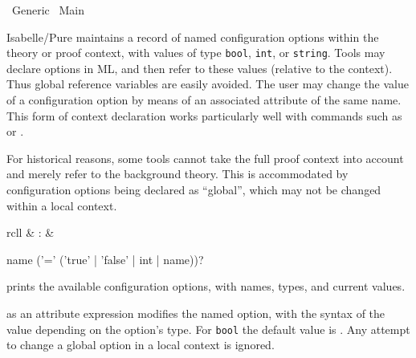 %
\begin{isabellebody}%
\def\isabellecontext{Generic}%
%
\isadelimtheory
\isanewline
\isanewline
%
\endisadelimtheory
%
\isatagtheory
{}\isamarkupfalse%
\ Generic\isanewline
{}\ Main\isanewline
{}%
\endisatagtheory
{\isafoldtheory}%
%
\isadelimtheory
%
\endisadelimtheory
%
\isamarkuptrue%
%
\isamarkuptrue%
%
\begin{isamarkuptext}%
Isabelle/Pure maintains a record of named configuration options
  within the theory or proof context, with values of type \verb|bool|, \verb|int|, or \verb|string|.  Tools may declare
  options in ML, and then refer to these values (relative to the
  context).  Thus global reference variables are easily avoided.  The
  user may change the value of a configuration option by means of an
  associated attribute of the same name.  This form of context
  declaration works particularly well with commands such as \hyperlink{command.declare}{\mbox{}} or \hyperlink{command.using}{\mbox{}}.

  For historical reasons, some tools cannot take the full proof
  context into account and merely refer to the background theory.
  This is accommodated by configuration options being declared as
  ``global'', which may not be changed within a local context.

  \begin{matharray}{rcll}
    \hypertarget{command.print-configs}{\hyperlink{command.print-configs}{\mbox{}}} & : &  \\
  \end{matharray}

  \begin{rail}
    name ('=' ('true' | 'false' | int | name))?
  \end{rail}

  \begin{descr}
  
  \item [\hyperlink{command.print-configs}{\mbox{\isa{\isacommand{print{\isacharunderscore}configs}}}}] prints the available
  configuration options, with names, types, and current values.
  
  \item [\isa{{\isachardoublequote}name\ {\isacharequal}\ value{\isachardoublequote}}] as an attribute expression modifies
  the named option, with the syntax of the value depending on the
  option's type.  For \verb|bool| the default value is .  Any attempt to change a global option in a local context is
  ignored.


\end{descr}
\end{isamarkuptext}
\end{isabellebody}
